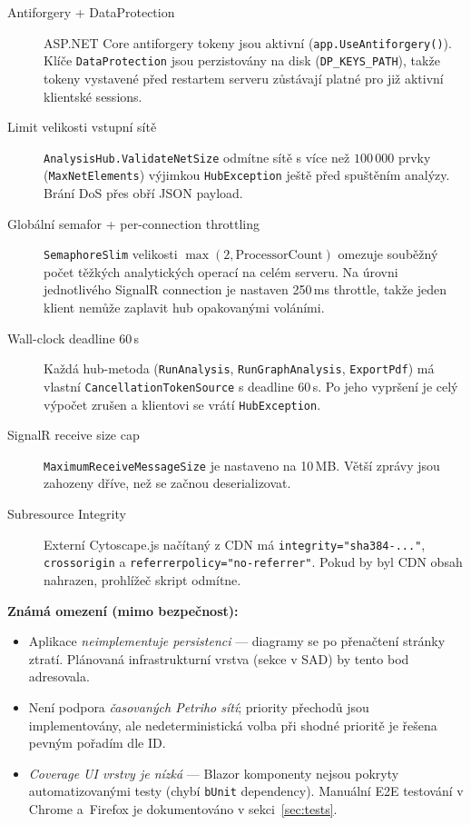 \documentclass[12pt,a4paper]{article}
\begin{document}
\begin{description}
    \item[Antiforgery + DataProtection] ASP.NET Core antiforgery
          tokeny jsou aktivní (\texttt{app.UseAntiforgery()}).
          Klíče \texttt{DataProtection} jsou perzistovány na disk
          (\texttt{DP\_KEYS\_PATH}), takže tokeny vystavené před
          restartem serveru zůstávají platné pro již aktivní
          klientské sessions.

    \item[Limit velikosti vstupní sítě] \texttt{AnalysisHub.ValidateNetSize}
          odmítne sítě s více než $100\,000$ prvky (\texttt{MaxNetElements})
          výjimkou \texttt{HubException} ještě před spuštěním analýzy.
          Brání DoS přes obří JSON payload.

    \item[Globální semafor + per-connection throttling]
          \texttt{SemaphoreSlim} velikosti $\max(2, \text{ProcessorCount})$
          omezuje souběžný počet těžkých analytických operací na celém
          serveru. Na úrovni jednotlivého SignalR connection je nastaven
          250\,ms throttle, takže jeden klient nemůže zaplavit hub
          opakovanými voláními.

    \item[Wall-clock deadline 60\,s] Každá hub-metoda
          (\texttt{RunAnalysis}, \texttt{RunGraphAnalysis},
          \texttt{ExportPdf}) má vlastní \texttt{CancellationTokenSource}
          s deadline 60\,s. Po jeho vypršení je celý výpočet zrušen
          a klientovi se vrátí \texttt{HubException}.

    \item[SignalR receive size cap] \texttt{MaximumReceiveMessageSize}
          je nastaveno na 10\,MB. Větší zprávy jsou zahozeny dříve,
          než se začnou deserializovat.

    \item[Subresource Integrity] Externí Cytoscape.js načítaný z CDN
          má \texttt{integrity="sha384-..."}, \texttt{crossorigin}
          a \texttt{referrerpolicy="no-referrer"}. Pokud by byl CDN
          obsah nahrazen, prohlížeč skript odmítne.
\end{description}

\textbf{Známá omezení (mimo bezpečnost):}

\begin{itemize}
    \item Aplikace \emph{neimplementuje persistenci} — diagramy se po
          přenačtení stránky ztratí. Plánovaná infrastrukturní vrstva
          (sekce v SAD) by tento bod adresovala.
    \item Není podpora \emph{časovaných Petriho sítí}; priority
          přechodů jsou implementovány, ale nedeterministická volba
          při shodné prioritě je řešena pevným pořadím dle ID.
    \item \emph{Coverage UI vrstvy je nízká} — Blazor komponenty
          nejsou pokryty automatizovanými testy (chybí \texttt{bUnit}
          dependency). Manuální E2E testování v Chrome a~Firefox je
          dokumentováno v sekci~\ref{sec:tests}.
\end{itemize}
\end{document}
